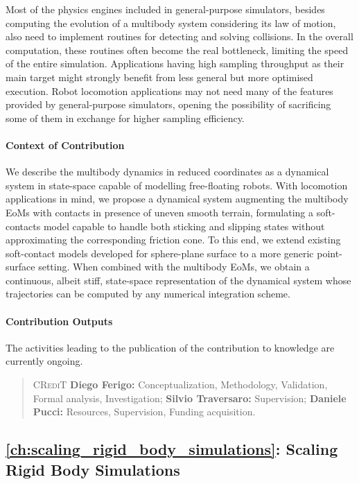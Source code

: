 Most of the physics engines included in general-purpose simulators, besides computing the evolution of a multibody system considering its law of motion, also need to implement routines for detecting and solving collisions.
In the overall computation, these routines often become the real bottleneck, limiting the speed of the entire simulation.
Applications having high sampling throughput as their main target might strongly benefit from less general but more optimised execution.
Robot locomotion applications may not need many of the features provided by general-purpose simulators, opening the possibility of sacrificing some of them in exchange for higher sampling efficiency.

\paragraph{Context of Contribution}

We describe the multibody dynamics in reduced coordinates as a dynamical system in state-space capable of modelling free-floating robots.
With locomotion applications in mind, we propose a dynamical system augmenting the multibody \acp{EoM} with contacts in presence of uneven smooth terrain, formulating a soft-contacts model capable to handle both sticking and slipping states without approximating the corresponding friction cone.
To this end, we extend existing soft-contact models developed for sphere-plane surface to a more generic point-surface setting.
When combined with the multibody \acp{EoM}, we obtain a continuous, albeit stiff, state-space representation of the dynamical system whose trajectories can be computed by any numerical integration scheme.

\paragraph{Contribution Outputs}

The activities leading to the publication of the contribution to knowledge are currently ongoing.
%
\begin{quote}
    \textsc{CRediT} \hspace{2mm}
    \textbf{Diego Ferigo:} Conceptualization, Methodology, Validation, Formal analysis, Investigation;
    \textbf{Silvio Traversaro:} Supervision;
    \textbf{Daniele Pucci:} Resources, Supervision, Funding acquisition.
\end{quote}

\subsection{\autoref{ch:scaling_rigid_body_simulations}: Scaling Rigid Body Simulations}


